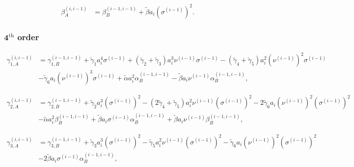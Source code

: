 \documentclass[12pt]{article}
\begin{document}
\begin{equation}
  \begin{aligned}
    \beta_{A}^{(i, i-1)} &= \beta_{B}^{(i-1, i-1)} + \tilde{\beta} a_{i} \left( \sigma^{(i-1)} \right)^{2}.
  \end{aligned}
\end{equation}

\subsubsection*{$\mathbf{4}^{\textrm{th}}$ order}

\vspace{0.2cm}

{\small
\begin{equation}
  \begin{aligned}
    \gamma_{1, A}^{(i, i-1)} &= \gamma_{1, B}^{(i-1, i-1)} + \tilde{\gamma}_{1} a_{i}^{4} \sigma^{(i-1)} + \left(\tilde{\gamma}_{2} + \tilde{\gamma}_{3} \right) a_{i}^{3} \nu^{(i-1)} \sigma^{(i-1)} - \left(\tilde{\gamma}_{4} + \tilde{\gamma}_{5} \right) a_{i}^{2} \left(\nu^{(i-1)} \right)^{2} \sigma^{(i-1)} \\
    & - \tilde{\gamma}_{6} a_{i} \left(\nu^{(i-1)} \right)^{3} \sigma^{(i-1)} + \tilde{\alpha} a_{i}^{2} \alpha_{B}^{(i-1, i-1)} - \tilde{\beta} a_{i} \nu^{(i-1)} \alpha_{B}^{(i-1, i-1)},
  \end{aligned}
\end{equation}
}

{\small
\begin{equation}
  \begin{aligned}
    \gamma_{2, A}^{(i, i-1)} &= \gamma_{2, B}^{(i-1, i-1)} + \tilde{\gamma}_{2} a_{i}^{3} \left( \sigma^{(i-1)} \right)^{2} - \left(2 \tilde{\gamma}_{4} + \tilde{\gamma}_{5} \right) a_{i}^{2} \nu^{(i-1)} \left(\sigma^{(i-1)} \right)^{2} - 2 \tilde{\gamma}_{6} a_{i} \left( \nu^{(i-1)} \right)^{2} \left( \sigma^{(i-1)} \right)^{2} \\
    & - \tilde{\alpha} a_{i}^{2} \beta_{B}^{(i-1, i-1)} + \tilde{\beta} a_{i} \sigma^{(i-1)} \alpha_{B}^{(i-1, i-1)} + \tilde{\beta} a_{i} \nu^{(i-1)} \beta_{B}^{(i-1, i-1)},
  \end{aligned}
\end{equation}
}

{\small
\begin{equation}
  \begin{aligned}
    \gamma_{3, A}^{(i, i-1)} &= \gamma_{3, B}^{(i-1, i-1)} + \tilde{\gamma}_{3} a_{i}^{3} \left( \sigma^{(i-1)} \right)^{2} - \tilde{\gamma}_{5} a_{i}^{2} \nu^{(i-1)} \left( \sigma^{(i-1)} \right)^{2} - \tilde{\gamma}_{6} a_{i} \left( \nu^{(i-1)} \right)^{2} \left( \sigma^{(i-1)} \right)^{2} \\
    & - 2 \tilde{\beta} a_{i} \sigma^{(i-1)} \alpha_{B}^{(i-1, i-1)},
  \end{aligned}
\end{equation}
}
\end{document}
